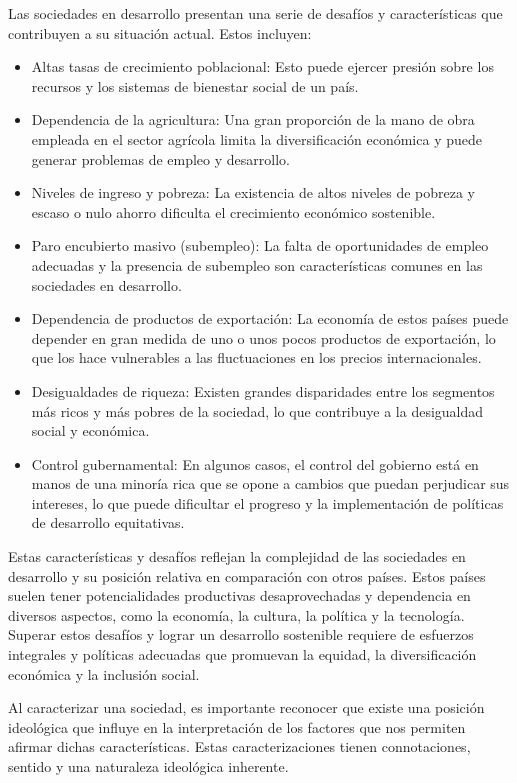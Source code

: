 \documentclass[
  letterpaper,
  DIV=11,
  numbers=noendperiod]{scrartcl}
\providecommand{\tightlist}{%
  \setlength{\itemsep}{0pt}\setlength{\parskip}{0pt}}\usepackage{longtable,booktabs,array}
\begin{document}
Las sociedades en desarrollo presentan una serie de desafíos y
características que contribuyen a su situación actual. Estos incluyen:

\begin{itemize}
\tightlist
\item
  Altas tasas de crecimiento poblacional: Esto puede ejercer presión
  sobre los recursos y los sistemas de bienestar social de un país.
\item
  Dependencia de la agricultura: Una gran proporción de la mano de obra
  empleada en el sector agrícola limita la diversificación económica y
  puede generar problemas de empleo y desarrollo.
\item
  Niveles de ingreso y pobreza: La existencia de altos niveles de
  pobreza y escaso o nulo ahorro dificulta el crecimiento económico
  sostenible.
\item
  Paro encubierto masivo (subempleo): La falta de oportunidades de
  empleo adecuadas y la presencia de subempleo son características
  comunes en las sociedades en desarrollo.
\item
  Dependencia de productos de exportación: La economía de estos países
  puede depender en gran medida de uno o unos pocos productos de
  exportación, lo que los hace vulnerables a las fluctuaciones en los
  precios internacionales.
\item
  Desigualdades de riqueza: Existen grandes disparidades entre los
  segmentos más ricos y más pobres de la sociedad, lo que contribuye a
  la desigualdad social y económica.
\item
  Control gubernamental: En algunos casos, el control del gobierno está
  en manos de una minoría rica que se opone a cambios que puedan
  perjudicar sus intereses, lo que puede dificultar el progreso y la
  implementación de políticas de desarrollo equitativas.
\end{itemize}

Estas características y desafíos reflejan la complejidad de las
sociedades en desarrollo y su posición relativa en comparación con otros
países. Estos países suelen tener potencialidades productivas
desaprovechadas y dependencia en diversos aspectos, como la economía, la
cultura, la política y la tecnología. Superar estos desafíos y lograr un
desarrollo sostenible requiere de esfuerzos integrales y políticas
adecuadas que promuevan la equidad, la diversificación económica y la
inclusión social.

Al caracterizar una sociedad, es importante reconocer que existe una
posición ideológica que influye en la interpretación de los factores que
nos permiten afirmar dichas características. Estas caracterizaciones
tienen connotaciones, sentido y una naturaleza ideológica inherente.
\end{document}

